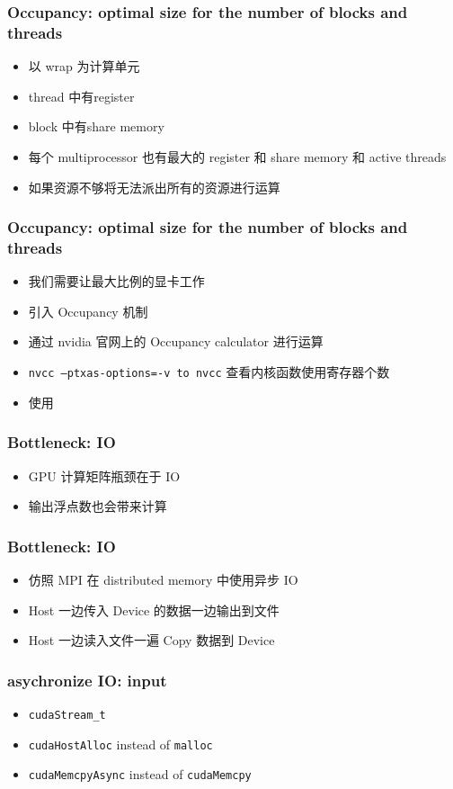 \begin{frame}
    \frametitle{Occupancy: optimal size for the number of blocks and threads}
    \begin{itemize}
        \item 以 wrap 为计算单元
        \item thread 中有register
        \item block 中有share memory
        \item 每个 multiprocessor 也有最大的 register 和 share memory 和  active threads
        \item 如果资源不够将无法派出所有的资源进行运算
    \end{itemize}
\end{frame}

\begin{frame}
    \frametitle{Occupancy: optimal size for the number of blocks and threads}
    \begin{itemize}
        \item 我们需要让最大比例的显卡工作
        \item 引入 Occupancy 机制
        \item 通过 nvidia 官网上的 Occupancy calculator 进行运算
        \item \texttt{nvcc --ptxas-options=-v to nvcc} 查看内核函数使用寄存器个数
        \item 使用 \texttt{}
    \end{itemize}
\end{frame}

\begin{frame}
    \frametitle{Bottleneck: IO}
    \begin{itemize}
        \item GPU 计算矩阵瓶颈在于 IO
        \item 输出浮点数也会带来计算
    \end{itemize}
\end{frame}

\begin{frame}
    \frametitle{Bottleneck: IO}
    \begin{itemize}
        \item 仿照 MPI 在 distributed memory 中使用异步 IO
        \item Host 一边传入 Device 的数据一边输出到文件
        \item Host 一边读入文件一遍 Copy 数据到 Device
    \end{itemize}
\end{frame}

\begin{frame}
    \frametitle{asychronize IO: input}
    \begin{itemize}
        \item \texttt{cudaStream_t}
        \item \texttt{cudaHostAlloc} instead of \texttt{malloc}
        \item \texttt{cudaMemcpyAsync} instead of \texttt{cudaMemcpy}
    \end{itemize}
\end{frame}